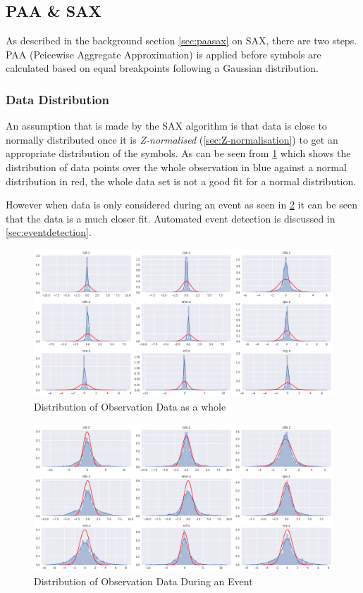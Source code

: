 \documentclass[../report.tex]{subfiles}
\begin{document}
	
\subsection{PAA \& SAX}
	As described in the background section \cref{sec:paasax} on SAX, there are two steps.  PAA (Peicewise Aggregate Approximation) is applied before symbols are calculated based on equal breakpoints following a Gaussian distribution.
	
\subsubsection{Data Distribution} \label{sec:distribution}
	An assumption that is made by the SAX algorithm is that data is close to normally distributed  once it is \textit{Z-normalised} (\cref{sec:Z-normalisation}) to get an appropriate distribution of the symbols.  As can be seen from \cref{fig:dist_obs} which shows the distribution of data points over the whole observation in blue against a normal distribution in red, the whole data set is not a good fit for a normal distribution.

	However when data is only considered during an event as seen in \cref{fig:dist_evt} it can be seen that the data is a much closer fit.  Automated event detection is discussed in \cref{sec:eventdetection}.
	
\begin{figure}[H]
	\centering
	\includegraphics[width=1\linewidth]{img/distribution_obs}
	\caption{Distribution of Observation Data as a whole}
	\label{fig:dist_obs}
\end{figure}

\begin{figure}[H]
	\centering
	\includegraphics[width=1\linewidth]{img/distribution_evt}
	\caption{Distribution of Observation Data During an Event}
	\label{fig:dist_evt}
\end{figure}
\end{document}
